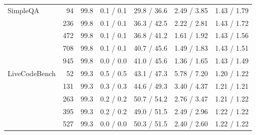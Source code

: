 \begin{table}[htbp]
\begin{tabular}{lrrrrrr}
SimpleQA & 94 & 99.8 & 0.1 / 0.1 & 29.8 / 36.6 & 2.49 / 3.85 & 1.43 / 1.79 \\
 & 236 & 99.8 & 0.1 / 0.1 & 36.3 / 42.5 & 2.22 / 2.81 & 1.43 / 1.72 \\
 & 472 & 99.8 & 0.1 / 0.1 & 36.8 / 41.2 & 1.61 / 1.92 & 1.43 / 1.56 \\
 & 708 & 99.8 & 0.1 / 0.1 & 40.7 / 45.6 & 1.49 / 1.83 & 1.43 / 1.51 \\
 & 945 & 99.8 & 0.0 / 0.0 & 41.0 / 45.6 & 1.36 / 1.65 & 1.43 / 1.49 \\
\addlinespace
LiveCodeBench & 52 & 99.3 & 0.5 / 0.5 & 43.1 / 47.3 & 5.78 / 7.20 & 1.20 / 1.22 \\
 & 131 & 99.3 & 0.3 / 0.3 & 44.6 / 49.3 & 3.40 / 4.37 & 1.21 / 1.21 \\
 & 263 & 99.3 & 0.2 / 0.2 & 50.7 / 54.2 & 2.76 / 3.47 & 1.21 / 1.22 \\
 & 395 & 99.3 & 0.2 / 0.2 & 49.0 / 51.5 & 2.49 / 2.96 & 1.22 / 1.22 \\
 & 527 & 99.3 & 0.0 / 0.0 & 50.3 / 51.5 & 2.40 / 2.60 & 1.22 / 1.22 \\
\bottomrule
\end{tabular}
\end{table}

